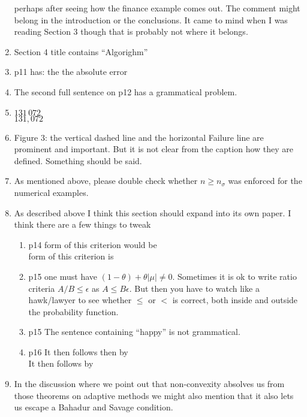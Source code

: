 \documentclass{article}
\begin{document}
\begin{enumerate}
perhaps after seeing how the finance example comes out.
The comment might belong in the introduction or the
conclusions. It came to mind when I was reading Section 3
though that is probably not where it belongs.
\item
Section 4 title contains ``Algorighm''
\item
p11 has: the the absolute error
\item
The second full sentence on p12 has a grammatical problem.
\item
$131\,072$\\
$131{,}072$
\item
Figure 3: the vertical dashed line and the
horizontal Failure line are prominent and important.
But it is not clear from the caption how they are
defined. Something should be said.
\item
As mentioned above, please double check whether $n\ge n_\sigma$
was enforced for the numerical examples.
\item
As described above I think this section should
expand into its own paper.  I think there are a few 
things to tweak
\begin{enumerate}
\item p14
form of this criterion would be\\
form of this criterion is
\item p15 one must
have $(1-\theta)+\theta|\mu|\ne 0$.
Sometimes it is ok to write ratio criteria
$A/B\le\epsilon$ as $A\le B\epsilon$. But
then you have to watch like a hawk/lawyer to see
whether $\le $ or $<$ is correct, both inside
and outside the probability function.
\item
p15 The sentence containing ``happy'' is not grammatical.
\item
p16 It then follows then by\\
It then follows by
\end{enumerate}
\item
In the discussion where we point out that
non-convexity absolves us
from those theorems on adaptive methods
we might also mention that it also lets
us escape a Bahadur and Savage condition.
\end{enumerate}
\end{document}
